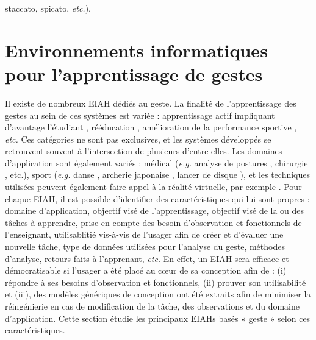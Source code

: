 staccato, spicato, \textit{etc.}).

\section{Environnements informatiques pour l'apprentissage de gestes}
Il existe de nombreux EIAH dédiés au geste. La finalité de l'apprentissage des gestes au sein de ces systèmes est variée : apprentissage actif impliquant d'avantage l'étudiant \parencite{Xu2019Ptt}, rééducation \parencite{Alankus2010TCG} \parencite{Baldominos2015AAt}, amélioration de la performance sportive \parencite{Maes2012DtM}, \textit{etc.} Ces catégories ne sont pas exclusives, et les systèmes développés se retrouvent souvent à l'intersection de plusieurs d'entre elles. Les domaines d'application sont également variés : médical (\textit{e.g.} analyse de postures \parencite{Aminian2004Chm}, chirurgie \parencite{BMT_2015}, etc.), sport (\textit{e.g.} danse \parencite{Maes2012DtM}, archerie japonaise \parencite{Yoshinaga2015Doa}, lancer de disque \parencite{Yamaoka2013FoF}), et les techniques utilisées peuvent également faire appel à la réalité virtuelle, par exemple \parencite{Kyan2015ABD}. Pour chaque EIAH, il est possible d'identifier des caractéristiques qui lui sont propres : domaine d'application, objectif visé de l'apprentissage, objectif visé de la ou des tâches à apprendre, prise en compte des besoin d'observation et fonctionnels de l'enseignant, utilisablitié vis-à-vis de l'usager afin de créer et d'évaluer une nouvelle tâche, type de données utilisées pour l'analyse du geste, méthodes d'analyse, retours faits à l'apprenant, \textit{etc.}  En effet, un EIAH sera efficace et démocratisable si l'usager a été placé au cœur de sa conception afin de : (i) répondre à ses besoins d'observation et fonctionnels, (ii) prouver son utilisabilité et (iii), des modèles génériques de conception ont été extraits afin de minimiser la réingénierie en cas de modification de la tâche, des observations et du domaine d'application. Cette section étudie les principaux EIAHs basés « geste » selon ces caractéristiques.


